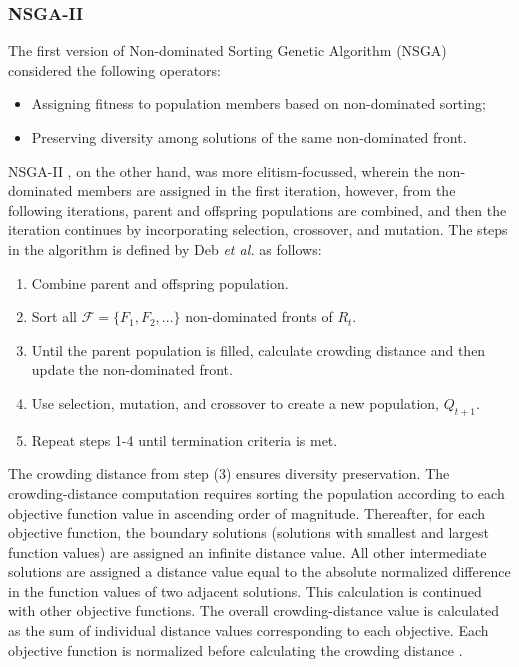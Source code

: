 \documentclass[sigconf, nonacm, preprint]{acmart}
\begin{document}
\subsubsection{NSGA-II} \label{Background_nsgaii}
The first version of Non-dominated Sorting Genetic Algorithm (NSGA) \cite{srinivas1994} considered the following operators:
\begin{itemize}
    \item Assigning fitness to population members based on non-dominated sorting;
    \item Preserving diversity among solutions of the same non-dominated front.
\end{itemize}
NSGA-II \cite{deb2002}, on the other hand, was more elitism-focussed, wherein the non-dominated members are assigned in the first iteration, however, from the following iterations, parent and offspring populations are combined, and then the iteration continues by incorporating selection, crossover, and mutation. The steps in the algorithm is defined by Deb \textit{et al.} \cite{deb2002} as follows:
\begin{enumerate}
    \item Combine parent and offspring population.
    \item Sort all $\mathcal{F} = \{F_{1},F_{2},...\}$ non-dominated fronts of $R_{t}$.
    \item Until the parent population is filled, calculate crowding distance and then update the non-dominated front.
    \item Use selection, mutation, and crossover to create a new population, $Q_{t+1}$.
    \item Repeat steps 1-4 until termination criteria is met.
\end{enumerate}
The crowding distance from step (3) ensures diversity preservation. The crowding-distance computation requires sorting the population according to each objective function value in ascending order of magnitude. Thereafter, for each objective function, the boundary solutions (solutions with smallest and largest function values) are assigned an infinite distance value. All other intermediate solutions are assigned a distance value equal to the absolute normalized difference in the function values of two adjacent solutions. This calculation is continued with other objective functions. The overall crowding-distance value is calculated as the sum of individual distance values corresponding to each objective. Each objective function is normalized before calculating the crowding distance \cite{deb2002}.
\end{document}
